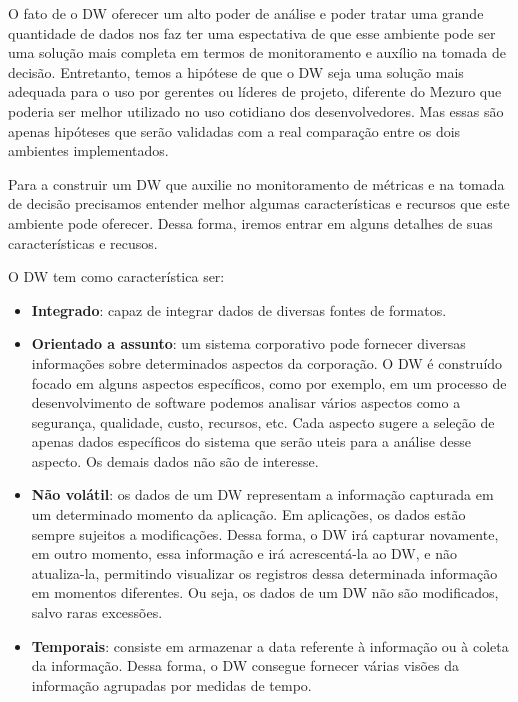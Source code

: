 % 
O fato de o DW oferecer um alto poder de análise e poder tratar uma grande quantidade de dados nos faz ter uma espectativa de que esse ambiente pode ser uma solução mais completa em termos de monitoramento e auxílio na tomada de decisão. Entretanto, temos a hipótese de que o DW seja uma solução mais adequada para o uso por gerentes ou líderes de projeto, diferente do Mezuro que poderia ser melhor utilizado no uso cotidiano dos desenvolvedores. Mas essas são apenas hipóteses que serão validadas com a real comparação entre os dois ambientes implementados.


%

Para a construir  um DW que auxilie no monitoramento de métricas e na tomada de decisão precisamos entender melhor algumas características e recursos que este ambiente pode oferecer. Dessa forma, iremos entrar em alguns detalhes de suas características e recusos.


O DW tem como característica ser:

\begin{itemize}

\item \textbf{Integrado}:
%
capaz de integrar dados de diversas fontes de formatos.

\item \textbf{Orientado a assunto}:
%
um sistema corporativo pode fornecer diversas informações sobre determinados aspectos da corporação.
%
O DW é construído focado em alguns aspectos específicos, como por exemplo, em um processo de desenvolvimento de software podemos analisar vários aspectos como a segurança, qualidade, custo, recursos, etc.
%
Cada aspecto sugere a seleção de apenas dados específicos do sistema que serão uteis para a análise desse aspecto. Os demais dados não são de interesse.

\item \textbf{Não volátil}:
%
os dados de um DW representam a informação capturada em um determinado momento da aplicação.
%
Em aplicações, os dados estão sempre sujeitos a modificações.
%
Dessa forma, o DW irá capturar novamente, em outro momento, essa informação e irá acrescentá-la ao DW, e não atualiza-la, permitindo visualizar os registros dessa determinada informação em momentos diferentes.
%
Ou seja, os dados de um DW não são modificados, salvo raras excessões.

\item \textbf{Temporais}:
%
consiste em armazenar a data referente à informação ou à coleta da informação. Dessa forma, o DW consegue fornecer várias visões da informação agrupadas por medidas de tempo. 

\end{itemize}

